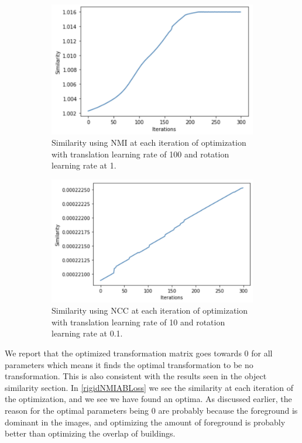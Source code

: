 \begin{figure}
	\centering
	\begin{subfigure}{0.4\linewidth}
		\centering
		\includegraphics[width=\linewidth]{Materials/RigidNMILoss}
		\caption{Similarity using NMI at each iteration of optimization with translation learning rate of 100 and rotation learning rate at 1.}
		\label{rigidNMIABLoss}
	\end{subfigure}
	\hspace{1cm}
	\begin{subfigure}{0.4\linewidth}
		\centering
		\includegraphics[width=\linewidth]{Materials/RigidNCCLoss}
		\caption{Similarity using NCC at each iteration of optimization with translation learning rate of 10 and rotation learning rate at 0.1.}
		\label{rigidNCCABLoss}
	\end{subfigure}
	\caption{}
\end{figure}
We report that the optimized transformation matrix goes towards 0 for all parameters which means it finds the optimal transformation to be no transformation. This is also consistent with the results seen in the object similarity section. In \autoref{rigidNMIABLoss} we see the similarity at each iteration of the optimization, and we see we have found an optima. As discussed earlier, the reason for the optimal parameters being 0 are probably because the foreground is dominant in the images, and optimizing the amount of foreground is probably better than optimizing the overlap of buildings.\\
